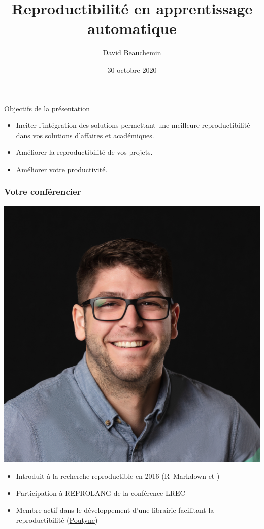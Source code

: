 \documentclass[aspectratio=169,10pt,xcolor=x11names,english,french]{beamer}
\title{Reproductibilité en apprentissage automatique}
\author{David Beauchemin}
\date{30 octobre 2020}
\begin{document}
	
	
	
	
	\begin{frame}{Objectifs de la présentation}
		\begin{itemize}
			\item Inciter l'intégration des solutions permettant une meilleure reproductibilité dans vos solutions d'affaires et académiques.
			\item Améliorer la reproductibilité de vos projets.
			\item Améliorer votre productivité.
		\end{itemize}
	\end{frame}
	
	\begin{frame}
		\frametitle{Votre conférencier}
		
		\begin{minipage}{0.25\linewidth}
			\includegraphics[width=\linewidth,keepaspectratio]{img/david}
		\end{minipage}
		\hfill
		\begin{minipage}{0.70\linewidth}
			\begin{itemize}
				\item Introduit à la recherche reproductible en 2016 (\mbox{R Markdown} et \faGit)
				\item Participation à REPROLANG de la conférence LREC \cite{garneau2020robust}
				\item Membre actif dans le développement d'une librairie facilitant la reproductibilité (\href{https://poutyne.org/}{Poutyne})
			\end{itemize}
		\end{minipage}
		

\end{frame}
\end{document}
